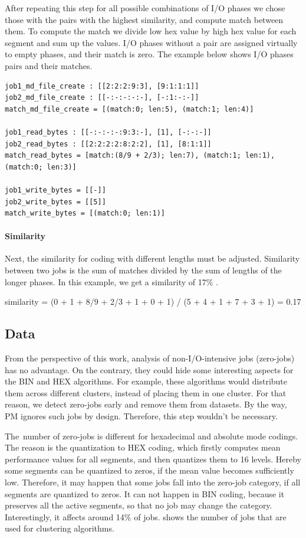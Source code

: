 \documentclass[]{llncs}
\begin{document}
After repeating this step for all possible combinations of I/O phases we chose those with the pairs with the highest similarity, and compute match between them.
To compute the match we divide low hex value by high hex value for each segment and sum up the values.
I/O phases without a pair are assigned virtually to empty phases, and their match is zero.
The example below shows I/O phases pairs and their matches.

\begin{lstlisting}
job1_md_file_create : [[2:2:2:9:3], [9:1:1:1]]
job2_md_file_create : [[-:-:-:-:-], [-:1:-:-]]
match_md_file_create = [(match:0; len:5), (match:1; len:4)]
 
job1_read_bytes : [[-:-:-:-:9:3:-], [1], [-:-:-]]
job2_read_bytes : [[2:2:2:2:8:2:2], [1], [8:1:1]]
match_read_bytes = [match:(8/9 + 2/3); len:7), (match:1; len:1), (match:0; len:3)]

job1_write_bytes = [[-]]
job2_write_bytes = [[5]]
match_write_bytes = [(match:0; len:1)]
\end{lstlisting}

\paragraph{Similarity}

Next, the similarity for coding with different lengths must be adjusted. Similarity between two jobs is the sum of matches divided by the sum of lengths of the longer phases. In this example, we get a similarity of 17$\%$ .

similarity = (0 + 1 + 8/9 + 2/3 + 1 + 0 + 1) / (5 + 4 + 1 + 7 + 3 + 1) = 0.17

\subsection{Data}
From the perspective of this work, analysis of non-I/O-intensive jobs (zero-jobs) has no advantage.
On the contrary, they could hide some interesting aspects for the BIN and HEX algorithms.
For example, these algorithms would distribute them across different clusters, instead of placing them in one cluster.
For that reason, we detect zero-jobs early and remove them from datasets.
By the way, PM ignores such jobs by design.
Therefore, this step wouldn't be necessary.

The\ number of zero-jobs is different for hexadecimal and absolute mode codings.
The reason is the quantization to HEX coding, which firstly computes mean performance values for all segments, and then quantizes them to 16 levels.
Hereby some segments can be quantized to zeros, if the mean value becomes sufficiently low.
Therefore, it may happen that some jobs fall into the zero-job category, if all segments are quantized to zeros.
 It can not happen in BIN coding, because it preserves all the active segments, so that no job may change the category.
Interestingly, it affects around 14$\%$  of jobs.
 shows the number of jobs that are used for clustering algorithms.
\end{document}
